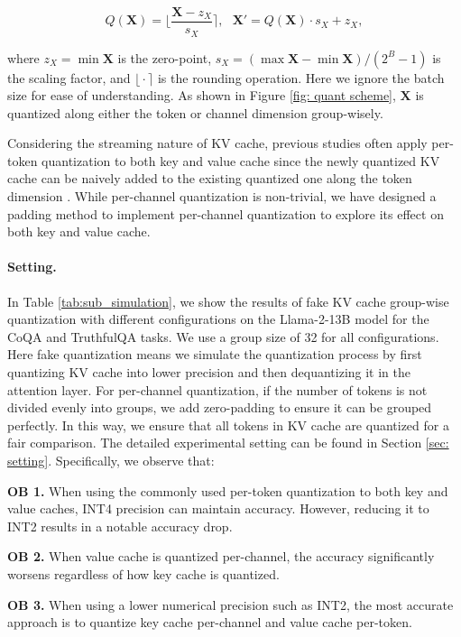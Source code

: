 \begin{equation}
    Q({\bm{X}}) = \bm\lfloor \frac{{\bm{X}} - z_X}{s_X} \bm\rceil, ~~~
    {\bm{X}}' = Q({\bm{X}}) \cdot s_X + z_X,  \nonumber
\end{equation}

where $z_X=\min {\bm{X}}$ is the zero-point, $s_X=(\max {\bm{X}} - \min {\bm{X}})/(2^B - 1)$ is the scaling factor, and $\bm\lfloor\cdot\bm\rceil$ is the rounding operation. Here we ignore the batch size for ease of understanding. As shown in Figure \ref{fig: quant scheme}, ${\bm{X}}$ is quantized along either the token or channel dimension group-wisely. 

Considering the streaming nature of KV cache, previous studies often apply per-token quantization to both key and value cache since the newly quantized KV cache can be naively added to the existing quantized one along the token dimension \citep{flexgen}. While per-channel quantization is non-trivial, we have designed a padding method to implement per-channel quantization to explore its effect on both key and value cache.

\paragraph{Setting.}
In Table \ref{tab:sub_simulation}, we show the results of fake KV cache group-wise quantization with different configurations on the Llama-2-13B model for the CoQA and TruthfulQA tasks. We use a group size of 32 for all configurations. Here fake quantization means we simulate the quantization process by first quantizing KV cache into lower precision and then dequantizing it in the attention layer. For per-channel quantization, if the number of tokens is not divided evenly into groups, we add zero-padding to ensure it can be grouped perfectly. In this way, we ensure that all tokens in KV cache are quantized for a fair comparison. The detailed experimental setting can be found in Section \ref{sec: setting}. Specifically, we observe that: 

\textbf{OB 1.} When using the commonly used per-token quantization to both key and value caches, INT4 precision can maintain accuracy. However, reducing it to INT2 results in a notable accuracy drop.

\textbf{OB 2.} When value cache is quantized per-channel, the accuracy significantly worsens regardless of how key cache is quantized.

\textbf{OB 3.}  When using a lower numerical precision such as INT2, the most accurate approach is to quantize key cache per-channel and value cache per-token.

